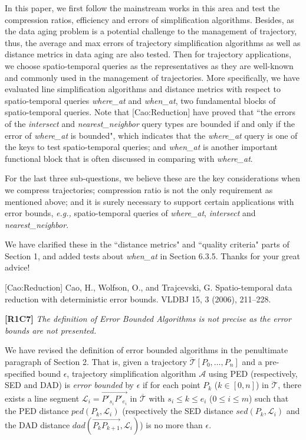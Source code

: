 \documentclass{letter}
\newcommand{\eg}{\emph{e.g.,}\xspace}
\newcommand{\vv}{\overrightarrow}
\begin{document}
{In this paper, we first follow the mainstream works in this area and test the compression ratios, efficiency and errors of simplification algorithms. 
Besides, as the data aging problem is a potential challenge to the management of trajectory, thus, the average and max errors of trajectory simplification algorithms as well as distance metrics in data aging are also tested.
%
Then for trajectory applications, we choose spatio-temporal queries as the representatives as they are well-known and commonly used in the management of trajectories.
More specifically, we have evaluated line simplification algorithms and distance metrics with respect to spatio-temporal queries \emph{where\_at} and \emph{when\_at}, two fundamental blocks of spatio-temporal queries. Note that [Cao:Reduction] have proved that ``the errors of the \emph{intersect} and \emph{nearest\_neighbor} query types are bounded if and only if the error of \emph{where\_at} is bounded", which indicates that the \emph{where\_at} query is one of the keys to test spatio-temporal queries; and \emph{when\_at} is another important functional block that is often discussed in comparing with \emph{where\_at}.

For the last three sub-questions, we believe these are the key considerations when we compress trajectories; compression ratio is not the only requirement as mentioned above; and it is surely necessary to support certain applications with error bounds, \eg spatio-temporal queries of \emph{where\_at}, \emph{intersect} and \emph{nearest\_neighbor}.


We have clarified these in the ``distance metrics" and ``quality criteria" parts of Section 1, and added tests about \emph{when\_at} in Section 6.3.5. Thanks for your great advice!


[Cao:Reduction] Cao, H., Wolfson, O., and Trajcevski, G. Spatio-temporal data reduction with deterministic error bounds. VLDBJ 15, 3 (2006), 211–228.




\textbf{[R1C7]} \emph{ The definition of Error Bounded Algorithms is not precise as the error bounds are not presented. }

We have revised the definition of error bounded algorithms in the penultimate paragraph of Section 2. That is, given a trajectory $\dddot{\mathcal{T}}\left[P_0, \dots, P_n\right]$ and a pre-specified bound $\epsilon$,
trajectory simplification algorithm $\mathcal{A}$ using PED (respectively, SED and DAD) is \emph{error bounded} by $\epsilon$ if for each point $P_k$ ($k\in[0,n]$) in $\dddot{\mathcal{T}}$, there exists a line segment $\mathcal{L}_i = \vv{P'_{s_i}P'_{e_i}}$ in $\overline{\mathcal{T}}$ with $s_i \le k \le e_i$ ($0\le i\le m$) such that the PED distance $ped\left(P_k, \mathcal{L}_i\right)$  (respectively the SED distance $sed\left(P_k, \mathcal{L}_i\right)$ and the DAD distance $dad\left(\vv{P_{k}P_{k+1}}, \mathcal{L}_i\right)$) is no more than  $\epsilon$.

}
\end{document}
